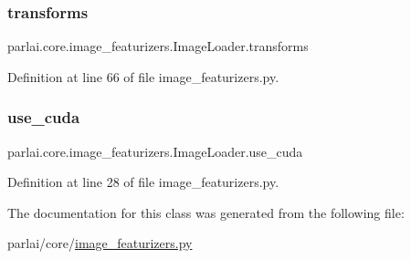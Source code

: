 \subsubsection{\texorpdfstring{transforms}{transforms}}
{\footnotesize\ttfamily parlai.\+core.\+image\+\_\+featurizers.\+Image\+Loader.\+transforms}



Definition at line 66 of file image\+\_\+featurizers.\+py.

\mbox{\label{classparlai_1_1core_1_1image__featurizers_1_1ImageLoader_a2185015cf2607aab32309949d7f342ba}} 
\subsubsection{\texorpdfstring{use\+\_\+cuda}{use\_cuda}}
{\footnotesize\ttfamily parlai.\+core.\+image\+\_\+featurizers.\+Image\+Loader.\+use\+\_\+cuda}



Definition at line 28 of file image\+\_\+featurizers.\+py.



The documentation for this class was generated from the following file\+:\begin{DoxyCompactItemize}
\item 
parlai/core/\hyperlink{image__featurizers_8py}{image\+\_\+featurizers.\+py}\end{DoxyCompactItemize}

